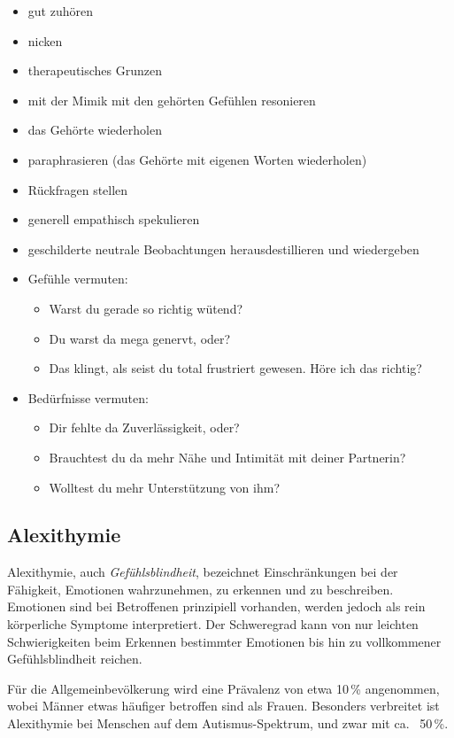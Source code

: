 \begin{itemize}
    \item gut zuhören
    \item nicken
    \item \glqq therapeutisches Grunzen\grqq
    \item mit der Mimik mit den gehörten Gefühlen resonieren
    \item das Gehörte wiederholen
    \item paraphrasieren (das Gehörte mit eigenen Worten wiederholen) 
    \item Rückfragen stellen
    \item generell \glqq empathisch spekulieren\grqq
    \item geschilderte neutrale Beobachtungen herausdestillieren und wiedergeben
    \item Gefühle vermuten:
    \begin{itemize}
        \item \glqq Warst du gerade so richtig wütend?\grqq
        \item \glqq Du warst da mega genervt, oder?\grqq
        \item \glqq Das klingt, als seist du total frustriert gewesen. Höre ich das richtig?\grqq
    \end{itemize}
    \item Bedürfnisse vermuten:
    \begin{itemize}
        \item \glqq Dir fehlte da Zuverlässigkeit, oder?\grqq
        \item \glqq Brauchtest du da mehr Nähe und Intimität mit deiner Partnerin?\grqq
        \item \glqq Wolltest du mehr Unterstützung von ihm?\grqq
    \end{itemize}
\end{itemize}

\subsection{Alexithymie}
\label{alexithymie}

Alexithymie, auch \emph{Gefühlsblindheit}, bezeichnet Einschränkungen bei der Fähigkeit, Emotionen wahrzunehmen, zu erkennen und zu beschreiben. Emotionen sind bei Betroffenen prinzipiell vorhanden, werden jedoch als rein körperliche Symptome interpretiert. Der Schweregrad kann von nur leichten Schwierigkeiten beim Erkennen bestimmter Emotionen bis hin zu vollkommener \glqq Gefühlsblindheit\grqq{} reichen.

Für die Allgemeinbevölkerung wird eine Prävalenz von etwa 10\,\% angenommen, wobei Männer etwas häufiger betroffen sind als Frauen. Besonders verbreitet ist Alexithymie bei Menschen auf dem Autismus-Spektrum, und zwar mit ca.~ 50\,\%.
